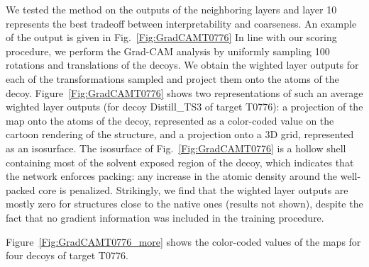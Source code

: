 We tested the method on the outputs of the neighboring layers and
layer 10 represents the best tradeoff between interpretability and
coarseness.
An example of the output is given in Fig.~\ref{Fig:GradCAMT0776}
In line with our scoring procedure, we perform the Grad-CAM analysis
by uniformly sampling 100 rotations and translations of the decoys. We
obtain the wighted layer outputs for each of the transformations sampled and
project them onto the atoms of the
decoy. Figure~\ref{Fig:GradCAMT0776} shows two representations of such
an average wighted layer outputs (for decoy Distill\_TS3 of target T0776): a
projection of the map onto the atoms of the decoy, represented as a
color-coded value on the cartoon rendering of the structure, and a
projection onto a 3D grid, represented as an isosurface. The
isosurface of Fig.~\ref{Fig:GradCAMT0776} is a hollow shell containing
most of the solvent exposed region of the decoy, which indicates that
the network enforces packing: any increase in the atomic density
around the well-packed core is penalized.
%
Strikingly, we find that the wighted layer outputs are mostly zero for
structures close to the native ones (results not shown), despite the
fact that no gradient information was included in the training
procedure. 

Figure~\ref{Fig:GradCAMT0776_more} shows the color-coded
values of the maps for four decoys of target T0776.


